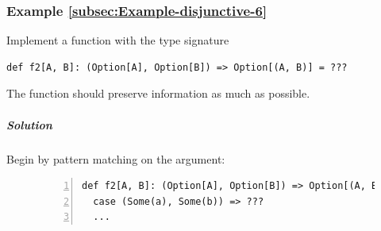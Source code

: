 \subsubsection{Example \label{subsec:Example-disjunctive-6}\ref{subsec:Example-disjunctive-6}}

Implement a function with the type signature 
\begin{lstlisting}
def f2[A, B]: (Option[A], Option[B]) => Option[(A, B)] = ???
\end{lstlisting}
The function should preserve information as much as possible.

\subparagraph{Solution}

Begin by pattern matching on the argument:

\begin{figure}%
\vspace{-0.6\baselineskip}
\begin{lstlisting}[numbers=left]
def f2[A, B]: (Option[A], Option[B]) => Option[(A, B)] = {
  case (Some(a), Some(b)) => ???
  ...
\end{lstlisting}

\vspace{-0.8\baselineskip}
\end{figure}%

